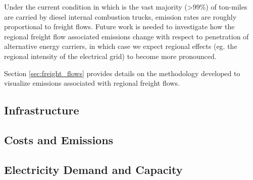Under the current condition in which is the vast majority (>99\%) of ton-miles are carried by diesel internal combustion trucks,  emission rates are roughly proportional to freight flows. Future work is needed to investigate how the regional freight flow associated emissions change with respect to penetration of alternative energy carriers, in which case we expect regional effects (eg. the regional intensity of the electrical grid) to become more pronounced. 

Section \ref{sec:freight_flows} provides details on the methodology developed to visualize emissions associated with regional freight flows. 

\subsection{Infrastructure}

\subsection{Costs and Emissions}

\subsection{Electricity Demand and Capacity}

